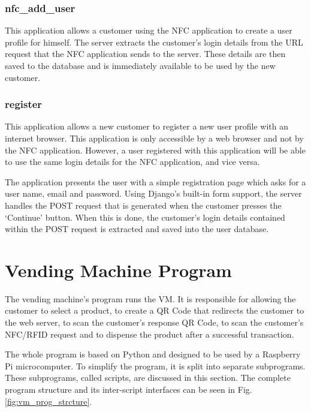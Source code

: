\subsubsection{nfc\_add\_user}

This application allows a customer using the NFC application to create a user profile for
himself. The server extracts the customer's login details from the URL request that the
NFC application sends to the server. These details are then saved to the database and is immediately available to be used by the new
customer. 

\subsubsection{register}

This application allows a new customer to register a new user profile with an internet
browser. This application is only accessible by a web browser and not by the NFC
application. However, a user registered with this application will be able to use the
same login details for the NFC application, and vice versa.

The application presents the user with a simple registration page which asks for a user
name, email and password. Using Django's built-in form support, the server handles the
POST request that is generated when the customer presses the `Continue' button. When this
is done, the customer's login details contained within the POST request is extracted and
saved into the user database.

\section{Vending Machine Program}

The vending machine's program runs the VM. It is responsible for
allowing the customer to select a product, to create a QR Code that redirects
the customer to the web server, to scan the customer's response QR Code, to
scan the customer's NFC/RFID request and to dispense the product after a successful
transaction.

The whole program is based on Python and designed to be used by a Raspberry Pi
microcomputer. To simplify the program, it is split into separate subprograms. These
subprograms, called scripts, are discussed in this section. The complete
program structure and its inter-script interfaces can be seen in Fig.
\ref{fig:vm_prog_strcture}.

